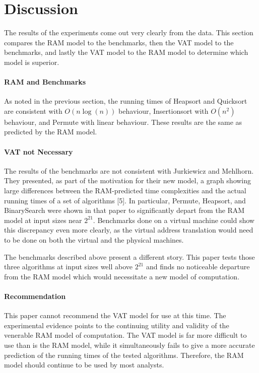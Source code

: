 \section{Discussion}

The results of the experiments come out very clearly from the data. This
section compares the RAM model to the benchmarks, then the VAT model to the
benchmarks, and lastly the VAT model to the RAM model to determine which model
is superior.

    \paragraph{RAM and Benchmarks}
    As noted in the previous section, the running times of Heapsort and
    Quicksort are consistent with $O(n\log(n))$ behaviour, Insertionsort with
    $O(n^2)$ behaviour, and Permute with linear behaviour. These results are
    the same as predicted by the RAM model. 
    
    \paragraph{VAT not Necessary}
    The results of the benchmarks are not consistent with Jurkiewicz and
    Mehlhorn. They presented, as part of the motivation for their new model, a 
    graph showing large differences between the RAM-predicted time complexities
    and the actual running times of a set of algorithms [5]. In particular,
    Permute, Heapsort, and BinarySearch were shown in that paper to
    significantly depart from the RAM model at input sizes near $2^{21}$.
    Benchmarks done on a virtual machine could show this discrepancy even more
    clearly, as the virtual address translation would need to be done on both
    the virtual and the physical machines.
    
    The benchmarks described above present a different story. This paper tests 
    those three algorithms at input sizes well above $2^{21}$ and finds no 
    noticeable departure from the RAM model which would necessitate a new model
    of computation. 
    
    \paragraph{Recommendation}
    This paper cannot recommend the VAT model for use at this time. The
    experimental evidence points to the continuing utility and validity of the
    venerable RAM model of computation. The VAT model is far more difficult to
    use than is the RAM model, while it simultaneously fails to give a more
    accurate prediction of the running times of the tested algorithms.
    Therefore, the RAM model should continue to be used by most analysts.
